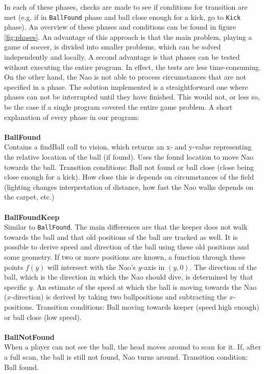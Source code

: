 \documentclass[11pt,a4paper,oneside]{article}
\begin{document}
In each of these phases, checks are made to see if conditions for transition are met (e.g. if in \texttt{BallFound} phase and ball close enough for a kick, go to \texttt{Kick} phase). An overview of these phases and conditions can be found in figure \ref{fig:phases}. An advantage of this approach is that the main problem, playing a game of soccer, is divided into smaller problems, which can be solved independently and locally. A second advantage is that phases can be tested without executing the entire program. In effect, the tests are less time-consuming. On the other hand, the Nao is not able to process circumstances that are not specified in a phase. The solution implemented is a straightforward one where phases can not be interrupted until they have finished. This would not, or less so, be the case if a single program covered the entire game problem. A short explanation of every phase in our program:\\\\
\textbf{BallFound} \\
Contains a findBall call to vision, which returns an x- and y-value representing the relative location of the ball (if found). Uses the found location to move Nao towards the ball. Transition conditions: Ball not found or ball close (close being close enough for a kick). How close this is depends on circumstances of the field (lighting changes interpretation of distance, how fast the Nao walks depends on the carpet, etc.) \\\\
\textbf{BallFoundKeep} \\
Similar to \texttt{BallFound}. The main differences are that the keeper does not walk towards the ball and that old positions of the ball are tracked as well. It is possible to derive speed and direction of the ball using these old positions and some geometry. If two or more positions are known, a function through these points $f(y)$ will intersect with the Nao's $y$-axis in $(y,0)$. The direction of the ball, which is the direction in which the Nao should dive, is determined by that specific $y$. An estimate of the speed at which the ball is moving towards the Nao ($x$-direction) is derived by taking two ballpositions and subtracting the $x$-positions. Transition conditions: Ball moving towards keeper (speed high enough) or ball close (low speed).\\\\
\textbf{BallNotFound} \\
When a player can not see the ball, the head moves around to scan for it. If, after a full scan, the ball is still not found, Nao turns around. Transition condition: Ball found.\\\\
\end{document}
